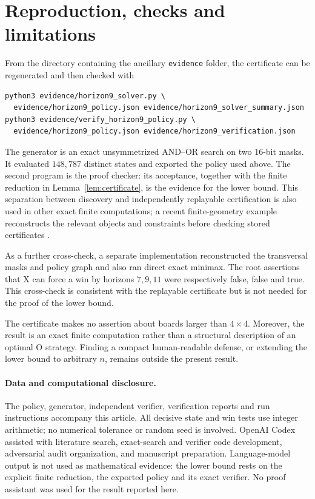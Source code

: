 \documentclass[11pt]{article}
\begin{document}
\section{Reproduction, checks and limitations}

From the directory containing the ancillary \texttt{evidence} folder, the
certificate can be regenerated and then checked with
\begin{verbatim}
python3 evidence/horizon9_solver.py \
  evidence/horizon9_policy.json evidence/horizon9_solver_summary.json
python3 evidence/verify_horizon9_policy.py \
  evidence/horizon9_policy.json evidence/horizon9_verification.json
\end{verbatim}
The generator is an exact unsymmetrized AND--OR search on two $16$-bit masks.
It evaluated $148{,}787$ distinct states and exported the policy used above.
The second program is the proof checker: its acceptance, together with the
finite reduction in Lemma~\ref{lem:certificate}, is the evidence for the
lower bound.  This separation between discovery and independently replayable
certification is also used in other exact finite computations; a recent
finite-geometry example reconstructs the relevant objects and constraints
before checking stored certificates \cite{ZengEtAl2026}.

As a further cross-check, a separate implementation reconstructed the
transversal masks and policy graph and also ran direct exact minimax.  The
root assertions that X can force a win by horizons $7,9,11$ were respectively
false, false and true.  This cross-check is consistent with the replayable
certificate but is not needed for the proof of the lower bound.

The certificate makes no assertion about boards larger than $4\times4$.
Moreover, the result is an exact finite computation rather than a structural
description of an optimal O strategy.  Finding a compact human-readable
defense, or extending the lower bound to arbitrary $n$, remains outside the
present result.

\paragraph{Data and computational disclosure.}
The policy, generator, independent verifier, verification reports and run
instructions accompany this article.  All decisive state and win tests use
integer arithmetic; no numerical tolerance or random seed is involved.
OpenAI Codex assisted with literature search, exact-search and verifier code
development, adversarial audit organization, and manuscript preparation.
Language-model output is not used as mathematical evidence: the lower bound
rests on the explicit finite reduction, the exported policy and its exact
verifier.  No proof assistant was used for the result reported here.



\end{document}
